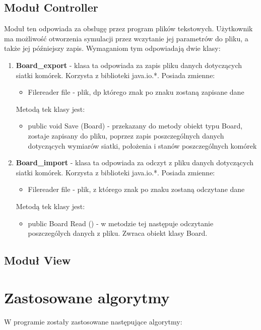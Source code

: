 \documentclass[10pt, oneside]{article}
\begin{document}
\subsection {Moduł Controller}
Moduł ten odpowiada za obsługę przez program plików tekstowych. Użytkownik ma możliwość otworzenia symulacji przez wczytanie jej parametrów do pliku, a także jej późniejszy zapis. Wymaganiom tym odpowiadają dwie klasy:
\begin {enumerate}
\item \textbf{Board\_export} - klasa ta odpowiada za zapis pliku danych dotyczących siatki komórek. Korzysta z biblioteki java.io.*.  Posiada zmienne:
\begin{itemize}
\item Filereader file - plik, dp którego znak po znaku zostaną zapisane dane
\end{itemize}
Metodą tek klasy jest:
\begin{itemize}
\item public void Save (Board) - przekazany do metody obiekt typu Board, zostaje zapisany do pliku, poprzez zapis poszczególnych danych dotyczących wymiarów siatki, położenia i stanów poszczególnych komórek
\end{itemize}


\item \textbf{Board\_import} - klasa ta odpowiada za odczyt z pliku danych dotyczących siatki komórek. Korzysta z biblioteki java.io.*.  Posiada zmienne:
\begin{itemize}
\item Filereader file - plik, z którego znak po znaku zostaną odczytane dane
\end{itemize}
Metodą tek klasy jest:
\begin{itemize}
\item public Board Read () - w metodzie tej następuje odczytanie poszczególych danych z pliku. Zwraca obiekt klasy Board.
\end{itemize}
\end{enumerate}

\subsection {Moduł View}

\section {Zastosowane algorytmy}
W programie zostały zastosowane następujące algorytmy:
\end{document}
